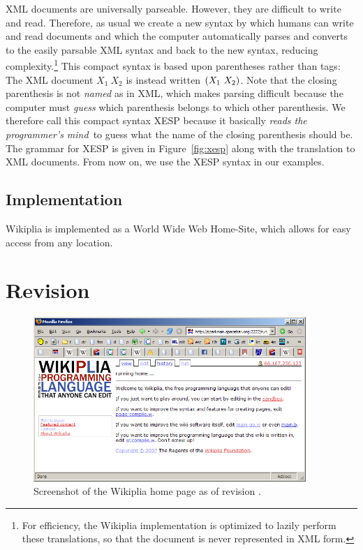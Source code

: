\documentclass[twocolumn]{article}
\begin{document}
XML documents are universally parseable.\z{} However,
they are difficult to write and read. Therefore, as usual we create a new syntax by which humans can write and read
documents and which the computer automatically parses and converts to
the easily parsable XML syntax and back to the new syntax, reducing
complexity.\z\footnote{For efficiency, the Wikiplia implementation is
optimized to lazily perform these translations, so that the document
is never represented in XML form.} This compact syntax is based upon
parentheses rather than tags: The XML document $\tag{list}{X_1\ X_2}$
is instead written ${\tt(}X_1\ X_2{\tt)}$. Note that the closing
parenthesis is not {\em named} as in XML, which makes parsing
difficult because the computer must {\em guess} which parenthesis
belongs to which other parenthesis. We therefore call this compact
syntax XESP because it basically {\em reads the programmer's
mind}\, to guess what the name of the
closing parenthesis should be. The grammar for XESP is given in
Figure~\ref{fig:xesp} along with the translation to XML documents.
From now on, we use the XESP syntax in our examples.

\subsection{Implementation}

Wikiplia is implemented as a World Wide Web Home-Site, which allows
for easy access from any location. 

\section{Revision \currentrevision} \label{sec:current}

\begin{figure}[t]
\begin{center}
\includegraphics[width=0.92\textwidth]{ss_homepage}
\end{center}
\caption{Screenshot of the Wikiplia home page as of revision
\currentrevision.} \label{fig:sshomepage}
\end{figure}
\end{document}
